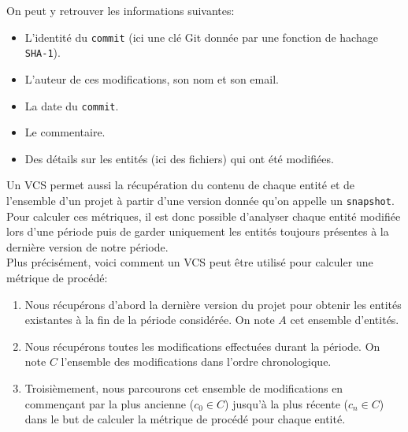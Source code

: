 On peut y retrouver les informations suivantes: 
\begin{itemize}
\item L'identité du \texttt{commit} (ici une clé Git donnée par une fonction de hachage \texttt{SHA-1}).
\item L'auteur de ces modifications, son nom et son email.
\item La date du \texttt{commit}.
\item Le commentaire.
\item Des détails sur les entités (ici des fichiers) qui ont été modifiées.\\
\end{itemize}

Un VCS permet aussi la récupération du contenu de chaque entité et de l'ensemble d'un projet à partir d'une version donnée qu'on appelle un \texttt{snapshot}. Pour calculer ces métriques, il est donc possible d'analyser chaque entité modifiée lors d'une période puis de garder uniquement les entités toujours présentes à la dernière version de notre période.\\

Plus précisément, voici comment un VCS peut être utilisé pour calculer une métrique de procédé: 
\begin{enumerate}
\item Nous récupérons d'abord la dernière version du projet pour obtenir les entités existantes à la fin de la période considérée. On note $A$ cet ensemble d'entités.
\item Nous récupérons toutes les modifications effectuées durant la période. On note $C$ l'ensemble des modifications dans l'ordre chronologique.
\item Troisièmement, nous parcourons cet ensemble de modifications en commençant par la plus ancienne ($c_0 \in C$) jusqu'à la plus récente ($c_n \in C$) dans le but de calculer la métrique de procédé pour chaque entité.
\end{enumerate}

